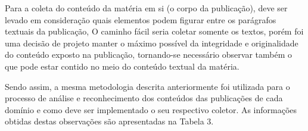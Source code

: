 Para a coleta do conteúdo da matéria em si (o corpo da publicação), deve ser levado em consideração quais elementos podem figurar entre os parágrafos textuais da publicação, O caminho fácil seria coletar somente os textos, porém foi uma decisão de projeto manter o máximo possível da integridade e originalidade do conteúdo exposto na publicação, tornando-se necessário observar também o que pode estar contido no meio do conteúdo textual da matéria. 

Sendo assim, a mesma metodologia descrita anteriormente foi utilizada para o processo de análise e reconhecimento dos conteúdos das publicações de cada domínio e como deve ser implementado o seu respectivo coletor. As informações obtidas destas observações são apresentadas na Tabela 3.  















